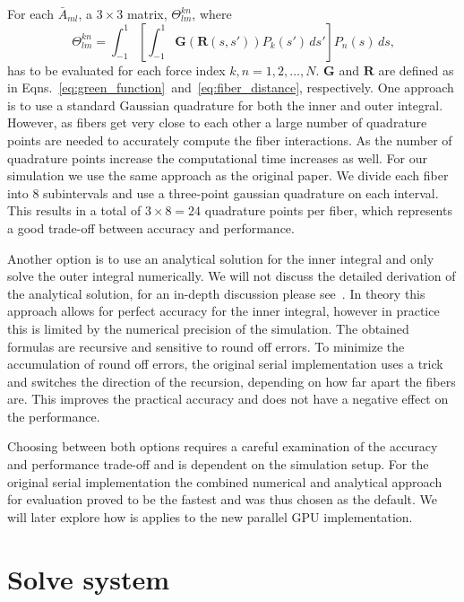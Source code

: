 For each $\bar{A}_{ml}$, a $3\times3$ matrix, $\Theta_{lm}^{kn}$, where
\begin{equation}
  \label{eq:inner_integral}
  \Theta_{lm}^{kn} = \int_{-1}^{1} \left[\int_{-1}^{1}\mathbf{G}(\mathbf{R}(s,s')) P_k(s') \, ds' \right]P_n(s) \, ds \text{,}
\end{equation}
has to be evaluated for each force index $k,n = 1,2,\dots,N$. $\mathbf{G}$ and $\mathbf{R}$ are defined as in Eqns.~\eqref{eq:green_function}~and~\eqref{eq:fiber_distance}, respectively. One approach is to use a standard Gaussian quadrature for both the inner and outer integral. However, as fibers get very close to each other a large number of quadrature points are needed to accurately compute the fiber interactions. As the number of quadrature points increase the computational time increases as well. For our simulation we use the same approach as the original paper. We divide each fiber into 8 subintervals and use a three-point gaussian quadrature on each interval. This results in a total of $3 \times 8 = 24$ quadrature points per fiber, which represents a good trade-off between accuracy and performance.

Another option is to use an analytical solution for the inner integral and only solve the outer integral numerically. We will not discuss the detailed derivation of the analytical solution, for an in-depth discussion please see~\cite{Tornberg2006}. In theory this approach allows for perfect accuracy for the inner integral, however in practice this is limited by the numerical precision of the simulation. The obtained formulas are recursive and sensitive to round off errors. To minimize the accumulation of round off errors, the original serial implementation uses a trick and switches the direction of the recursion, depending on how far apart the fibers are. This improves the practical accuracy and does not have a negative effect on the performance.

Choosing between both options requires a careful examination of the accuracy and performance trade-off and is dependent on the simulation setup. For the original serial implementation the combined numerical and analytical approach for evaluation proved to be the fastest and was thus chosen as the default. We will later explore how is applies to the new parallel GPU implementation.

\section{Solve system}

